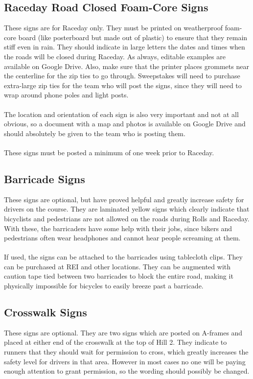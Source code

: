 \subsection{Raceday Road Closed Foam-Core Signs}
These signs are for Raceday only. They must be printed on weatherproof
foam-core board (like posterboard but made out of plastic) to ensure that
they remain stiff even in rain. They should indicate in large letters
the dates and times when the roads will be closed during Raceday. As always,
editable examples are available on Google Drive. Also, make sure that the
printer places grommets near the centerline for the zip ties to go through.
Sweepstakes will need to purchase extra-large zip ties for the team who
will post the signs, since they will need to wrap around phone poles and
light posts.
\\\\
The location and orientation of each sign is also very
important and not at all obvious, so a document with a map and photos is
available on Google Drive and should absolutely be given to the team who is
posting them.
\\\\
These signs must be posted a minimum of one week prior to Raceday.

\subsection{Barricade Signs}
These signs are optional, but have proved helpful and greatly increase
safety for drivers on the course. They are laminated yellow
signs which clearly indicate that bicyclists and pedestrians are not allowed
on the roads during Rolls and Raceday. With these, the barricaders have some
help with their jobs, since bikers and pedestrians often wear headphones and
cannot hear people screaming at them.
\\\\
If used, the signs can be attached to the barricades using tablecloth clips.
They can be purchased at REI and other locations. They can be augmented with
caution tape tied between two barricades to block the entire road, making
it physically impossible for bicycles to easily breeze past a barricade.

\subsection{Crosswalk Signs}
These signs are optional. They are two signs which are posted on A-frames and
placed at either end of the crosswalk at the top of Hill 2. They indicate to
runners that they should wait for permission to cross, which greatly increases
the safety level for drivers in that area. However in most cases no one will
be paying enough attention to grant permission, so the wording should possibly
be changed.


